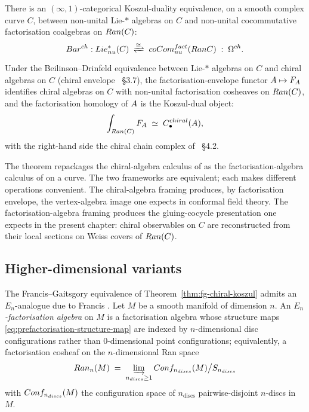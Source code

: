 \begin{theorem}
\label{thm:fg-chiral-koszul}
There is an $(\infty, 1)$-categorical Koszul-duality equivalence, on a
smooth complex curve $C$, between non-unital Lie-$\ast$ algebras on $C$
and non-unital cocommutative factorisation coalgebras on $Ran(C)$:
\begin{equation}
\label{eq:fg-koszul-duality-raw}
  \Bar^{\mathrm{ch}} \colon
  \Lie^{\ast}_{\mathrm{nu}}(C) \;\xrightleftharpoons{\simeq}\;
  \coCom^{\mathrm{fact}}_{\mathrm{nu}}(\Ran C) \;\colon\; \Omega^{\mathrm{ch}}.
\end{equation}
Under the Beilinson--Drinfeld equivalence between Lie-$\ast$ algebras
on $C$ and chiral algebras on $C$ \textup{(}chiral envelope
\cite{BeilinsonDrinfeld}~\S3.7\textup{),} the factorisation-envelope
functor $A \mapsto F_{A}$ identifies chiral algebras on $C$ with
non-unital factorisation cosheaves on $Ran(C)$, and the factorisation
homology of $A$ is the Koszul-dual object:
\begin{equation}
\label{eq:fg-koszul-duality}
  \int_{Ran(C)} F_{A} \;\simeq\; C_\bullet^{chiral}(A),
\end{equation}
with the right-hand side the chiral chain complex of
\cite{BeilinsonDrinfeld}~\S4.2.
\end{theorem}

The theorem repackages the chiral-algebra calculus of
\cite{BeilinsonDrinfeld} as the factorisation-algebra calculus of
\cite{CostelloGwilliam,CostelloGwilliam2017} on a curve. The two
frameworks are equivalent; each makes different operations convenient.
The chiral-algebra framing produces, by factorisation envelope, the
vertex-algebra image one expects in conformal field theory. The
factorisation-algebra framing produces the gluing-cocycle presentation
one expects in the present chapter: chiral observables on $C$ are
reconstructed from their local sections on Weiss covers of $Ran(C)$.

\subsection{Higher-dimensional variants}
\label{subsec:higher-en-fa}

The Francis--Gaitsgory equivalence of Theorem~\ref{thm:fg-chiral-koszul}
admits an $E_n$-analogue due to Francis \cite{Francis2013}. Let $M$
be a smooth manifold of dimension $n$. An \emph{$E_n$-factorisation
algebra} on $M$ is a factorisation algebra whose structure maps
\eqref{eq:prefactorisation-structure-map} are indexed by
$n$-dimensional disc configurations rather than $0$-dimensional point
configurations; equivalently, a factorisation cosheaf on the
$n$-dimensional Ran space
\begin{equation}
\label{eq:higher-ran-space}
  Ran_n(M) \;=\; \varinjlim_{n_{discs} \ge 1}
  Conf_{n_{discs}}(M) \big/ S_{n_{discs}}
\end{equation}
with $Conf_{n_{discs}}(M)$ the configuration space of
$n_{\mathrm{discs}}$ pairwise-disjoint $n$-discs in $M$.

